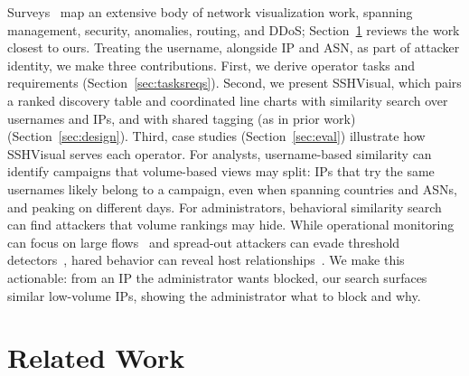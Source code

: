 \documentclass[conference]{IEEEtran}
\begin{document}
Surveys~\cite{7166305, 6007132, zhang2017survey, raynor2022state, wu2018research} map an extensive body of network visualization work, 
    spanning management, security, anomalies, routing, and DDoS; Section~\ref{sec:related} reviews the work closest to ours. 
Treating the username, alongside IP and ASN, as part of attacker identity, we make three contributions.
First, we derive operator tasks and requirements (Section~\ref{sec:tasksreqs}). Second, we present SSHVisual, which pairs
a ranked discovery table and coordinated line charts with similarity search over usernames and IPs, and with shared tagging (as in prior work)
(Section~\ref{sec:design}). Third, case studies (Section~\ref{sec:eval}) illustrate how SSHVisual serves each operator. For analysts,
username-based similarity can identify campaigns that volume-based views may split: IPs that try the same usernames
likely belong to a campaign, even when spanning countries and ASNs, and peaking on different days. For administrators,
behavioral similarity search can find attackers that volume rankings may hide. While operational monitoring can focus on large
flows~\cite{estan2002newdirections} and spread-out attackers can evade threshold detectors~\cite{staniford2002spice,griffioen2020collaboration},
hared behavior can reveal host relationships~\cite{gu2008botminer}. We make this actionable: from an IP 
the administrator wants blocked, our search surfaces similar low-volume IPs, showing the administrator what to block and why.



\section{Related Work}
\label{sec:related}
\end{document}

